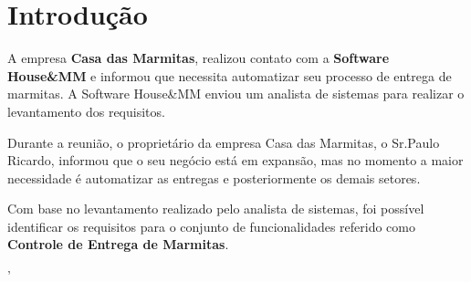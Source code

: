 \documentclass[
	12pt,				%
	openright,			%
	twoside,			%
	a4paper,			%
	english,			%
	french,				%
	spanish,			%
	brazil,				%
	]{abntex2}
\begin{document}
 
\frenchspacing
 
 
\imprimircapa
 
\tableofcontents*
\cleardoublepage
  
 
\textual
 
\chapter*[Introdução]{Introdução}

A empresa \textbf{Casa das Marmitas}, realizou contato com a \textbf{Software House\&MM} e informou que necessita automatizar seu processo de entrega de marmitas. A Software House\&MM enviou um analista de sistemas para realizar o levantamento dos requisitos.

Durante a reunião, o proprietário da empresa Casa das Marmitas, o Sr.Paulo Ricardo, informou que o seu negócio está em expansão, mas no momento a maior necessidade é automatizar as entregas e posteriormente os demais setores.

Com base no levantamento realizado pelo analista de sistemas, foi possível identificar os requisitos para o conjunto de funcionalidades referido como \textbf{Controle de Entrega de Marmitas}.
 
















'
 
\postextual
 
 
%
 
\end{document}
